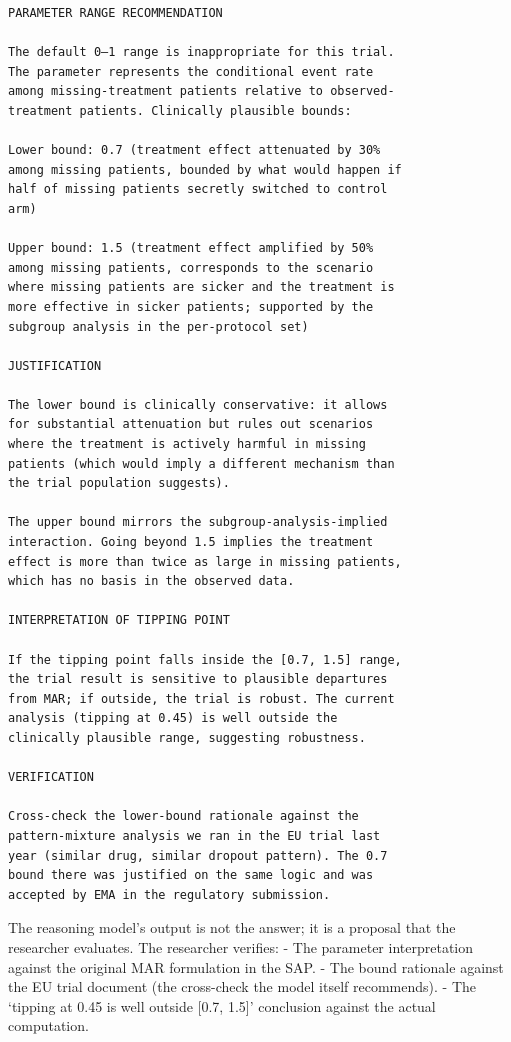 \documentclass[
  letterpaper,
  11pt]{scrbook}
\begin{document}
\begin{verbatim}
PARAMETER RANGE RECOMMENDATION

The default 0–1 range is inappropriate for this trial.
The parameter represents the conditional event rate
among missing-treatment patients relative to observed-
treatment patients. Clinically plausible bounds:

Lower bound: 0.7 (treatment effect attenuated by 30%
among missing patients, bounded by what would happen if
half of missing patients secretly switched to control
arm)

Upper bound: 1.5 (treatment effect amplified by 50%
among missing patients, corresponds to the scenario
where missing patients are sicker and the treatment is
more effective in sicker patients; supported by the
subgroup analysis in the per-protocol set)

JUSTIFICATION

The lower bound is clinically conservative: it allows
for substantial attenuation but rules out scenarios
where the treatment is actively harmful in missing
patients (which would imply a different mechanism than
the trial population suggests).

The upper bound mirrors the subgroup-analysis-implied
interaction. Going beyond 1.5 implies the treatment
effect is more than twice as large in missing patients,
which has no basis in the observed data.

INTERPRETATION OF TIPPING POINT

If the tipping point falls inside the [0.7, 1.5] range,
the trial result is sensitive to plausible departures
from MAR; if outside, the trial is robust. The current
analysis (tipping at 0.45) is well outside the
clinically plausible range, suggesting robustness.

VERIFICATION

Cross-check the lower-bound rationale against the
pattern-mixture analysis we ran in the EU trial last
year (similar drug, similar dropout pattern). The 0.7
bound there was justified on the same logic and was
accepted by EMA in the regulatory submission.
\end{verbatim}

The reasoning model's output is not the answer; it is a proposal that
the researcher evaluates. The researcher verifies: - The parameter
interpretation against the original MAR formulation in the SAP. - The
bound rationale against the EU trial document (the cross-check the model
itself recommends). - The `tipping at 0.45 is well outside {[}0.7,
1.5{]}' conclusion against the actual computation.
\end{document}
